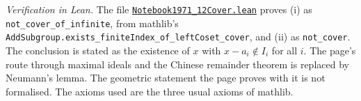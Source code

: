 \emph{Verification in Lean.} The file \href{\leanblobmain/Notebook1971_12Cover.lean}{\texttt{Notebook1971\_12Cover.\allowbreak{}lean}} proves (i) as \texttt{not\_cover\_of\_infinite}, from mathlib's \texttt{AddSubgroup.exists\_finiteIndex\_of\_leftCoset\_cover}, and (ii) as \texttt{not\_cover}. The conclusion is stated as the existence of $x$ with $x - a_i \notin I_i$ for all $i$. The page's route through maximal ideals and the Chinese remainder theorem is replaced by Neumann's lemma. The geometric statement the page proves with it is not formalised. The axioms used are the three usual axioms of mathlib.

